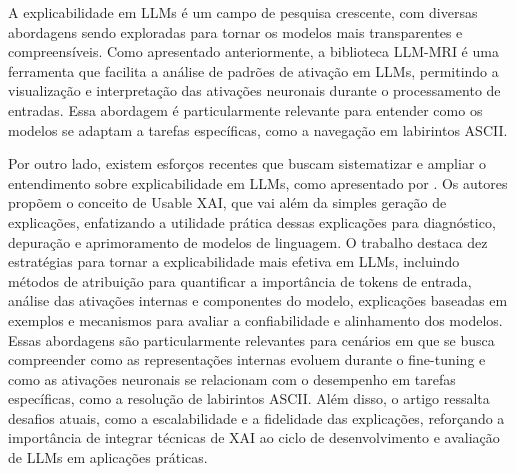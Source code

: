 A explicabilidade em LLMs é um campo de pesquisa crescente, com diversas abordagens sendo exploradas para tornar os modelos mais transparentes e compreensíveis. Como apresentado anteriormente, a biblioteca LLM-MRI \cite{costa2024llmmri} é uma ferramenta que facilita a análise de padrões de ativação em LLMs, permitindo a visualização e interpretação das ativações neuronais durante o processamento de entradas. Essa abordagem é particularmente relevante para entender como os modelos se adaptam a tarefas específicas, como a navegação em labirintos ASCII.

Por outro lado, existem esforços recentes que buscam sistematizar e ampliar o entendimento sobre explicabilidade em LLMs, como apresentado por \cite{wu2025usablexai10strategies}. Os autores propõem o conceito de Usable XAI, que vai além da simples geração de explicações, enfatizando a utilidade prática dessas explicações para diagnóstico, depuração e aprimoramento de modelos de linguagem. O trabalho destaca dez estratégias para tornar a explicabilidade mais efetiva em LLMs, incluindo métodos de atribuição para quantificar a importância de tokens de entrada, análise das ativações internas e componentes do modelo, explicações baseadas em exemplos e mecanismos para avaliar a confiabilidade e alinhamento dos modelos. Essas abordagens são particularmente relevantes para cenários em que se busca compreender como as representações internas evoluem durante o fine-tuning e como as ativações neuronais se relacionam com o desempenho em tarefas específicas, como a resolução de labirintos ASCII. Além disso, o artigo ressalta desafios atuais, como a escalabilidade e a fidelidade das explicações, reforçando a importância de integrar técnicas de XAI ao ciclo de desenvolvimento e avaliação de LLMs em aplicações práticas.
